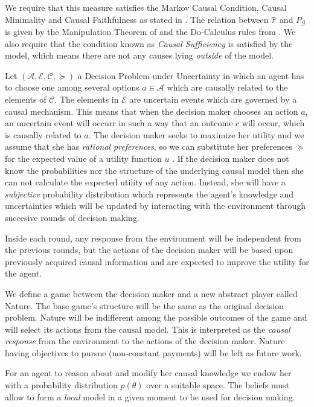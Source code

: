 \documentclass{article}
\begin{document}
We require that this measure satisfies the Markov Causal Condition, Causal Minimality and Causal Faithfulness as stated in \cite{spirtes2000causation}. The relation between $\mathbb{P}$ and $P_{\mathcal{G}}$ is given by the Manipulation Theorem of \cite{spirtes2000causation} and the Do-Calculus rules from \cite{pearl2009causality}. We also require that the condition known as \textit{Causal Sufficiency} is satisfied by the model, which means there are not any causes lying \textit{outside} of the model. 

Let $(\mathcal{A},\mathcal{E},\mathcal{C},\succeq)$ a Decision Problem under Uncertainty in which an agent has to choose one among several options $a \in \mathcal{A}$ which are causally related to the elements of $\mathcal{C}$. The elements in $\mathcal{E}$ are uncertain events which are governed by a causal mechanism. This means that when the decision maker chooses an action $a$, an uncertain event will occurr in such a way that an outcome $c$ will occur, which is causally related to $a$. The decision maker seeks to maximize her utility and we assume that she has \textit{rational preferences}, so we can substitute her preferences $\succeq$ for the expected value of a utility function $u$ \cite{gilboa2009decision}. If the decision maker does not know the probabilities nor the structure of the underlying causal model then she can not calculate the expected utility of any action. Instead, she will have a \textit{subjective} probability distribution which represents the agent's knowledge and uncertainties which will be updated by interacting with the environment through succesive rounds of decision making. 

Inside each round, any response from the environment will be independent from the previous rounds, but the actions of the decision maker will be based upon previously acquired causal information and are expected to improve the utility for the agent.

We define a game between the decision maker and a new abstract player called Nature. The base game's structure will be the same as the original decision problem. Nature will be indifferent among the possible outcomes of the game and will select its actions from the causal model. This is interpreted as the \textit{causal response} from the environment to the actions of the decision maker. Nature having objectives to pursue (non-constant payments) will be left as future work.

For an agent to reason about and modify her causal knowledge we endow her with a probability distribution $p(\theta)$ over a suitable space. The beliefs must allow to form a \textit{local} model in a given moment to be used for decision making.
\end{document}
